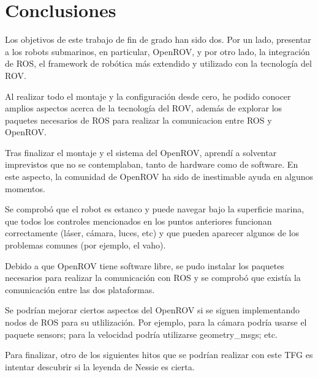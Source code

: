 \chapter{Conclusiones}
\label{cap:conclusiones}

Los objetivos de este trabajo de fin de grado han sido dos. Por un lado, presentar a los robots submarinos, en particular, OpenROV, y por otro lado, la integración de ROS, el framework de robótica más extendido y utilizado con la tecnología del ROV.

Al realizar todo el montaje y la configuración desde cero, he podido conocer amplios aspectos acerca de la tecnología del ROV, además de explorar los paquetes necesarios de ROS para realizar la comunicacion entre ROS y OpenROV.

Tras finalizar el montaje y el sistema del OpenROV, aprendí a solventar imprevistos que no se contemplaban, tanto de hardware como de software. En este aspecto, la comunidad de OpenROV ha sido de inestimable ayuda en algunos momentos.

Se comprobó que el robot es estanco y puede navegar bajo la superficie marina, que todos los controles mencionados en los puntos anteriores funcionan correctamente (láser, cámara, luces, etc) y que pueden aparecer algunos de los problemas comunes (por ejemplo, el vaho).

Debido a que OpenROV tiene software libre, se pudo instalar los paquetes necesarios para realizar la comunicación con ROS y se comprobó que existía la comunicación entre las dos plataformas. 

Se podrían mejorar ciertos aspectos del OpenROV si se siguen implementando nodos de ROS para su utlilización. Por ejemplo, para la cámara podría usarse el paquete sensors; para la velocidad podría utilizarse geometry\_msgs; etc. 

Para finalizar, otro de los siguientes hitos que se podrían realizar con este TFG es intentar descubrir si la leyenda de Nessie es cierta.
